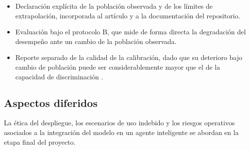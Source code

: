 \begin{itemize}
  \item Declaración explícita de la población observada y de los límites de
        extrapolación, incorporada al artículo y a la documentación del
        repositorio.
  \item Evaluación bajo el protocolo B, que mide de forma directa la
        degradación del desempeño ante un cambio de la población observada.
  \item Reporte separado de la calidad de la calibración, dado que su
        deterioro bajo cambio de población puede ser considerablemente
        mayor que el de la capacidad de discriminación
        \cite{xenopoulos_winprob_2022}.
\end{itemize}


\subsection{Aspectos diferidos}
\label{subsec:diferido}

La ética del despliegue, los escenarios de uso indebido y los riesgos
operativos asociados a la integración del modelo en un agente inteligente
se abordan en la etapa final del proyecto.